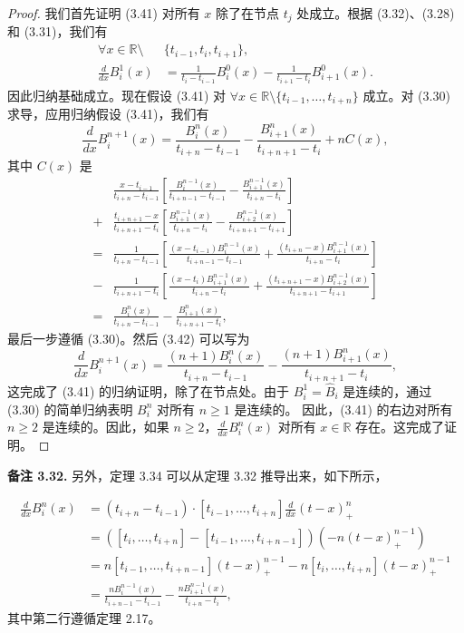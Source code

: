 \documentclass[a4paper]{ctexart}
\begin{document}
{\begin{proof}
我们首先证明 (3.41) 对所有 $x$ 除了在节点 $t_j$ 处成立。根据 (3.32)、(3.28) 和 (3.31)，我们有
  \begin{align*}
  \forall x \in \mathbb{R} \setminus &\{t_{i-1}, t_i, t_{i+1}\}, \\
  \frac{d}{dx} B_i^1(x) &= \frac{1}{t_i - t_{i-1}} B_i^0(x) - \frac{1}{t_{i+1} - t_i} B_{i+1}^0(x).
  \end{align*}
  因此归纳基础成立。现在假设 (3.41) 对 $\forall x \in \mathbb{R} \setminus \{t_{i-1}, \ldots, t_{i+n}\}$ 成立。对 (3.30) 求导，应用归纳假设 (3.41)，我们有
  \[
  \frac{d}{dx} B_i^{n+1}(x) = \frac{B_i^n(x)}{t_{i+n} - t_{i-1}} - \frac{B_{i+1}^n(x)}{t_{i+n+1} - t_i} + n C(x),
  \tag{3.42}
  \]
  其中 $C(x)$ 是
  \begin{align*}
  &\frac{x - t_{i-1}}{t_{i+n} - t_{i-1}} \left[ \frac{B_i^{n-1}(x)}{t_{i+n-1} - t_{i-1}} - \frac{B_{i+1}^{n-1}(x)}{t_{i+n} - t_i} \right] \\
  +& \frac{t_{i+n+1} - x}{t_{i+n+1} - t_i} \left[ \frac{B_{i+1}^{n-1}(x)}{t_{i+n} - t_i} - \frac{B_{i+2}^{n-1}(x)}{t_{i+n+1} - t_{i+1}} \right] \\
  =& \frac{1}{t_{i+n} - t_{i-1}} \left[ \frac{(x - t_{i-1}) B_i^{n-1}(x)}{t_{i+n-1} - t_{i-1}} + \frac{(t_{i+n} - x) B_{i+1}^{n-1}(x)}{t_{i+n} - t_i} \right] \\
  -& \frac{1}{t_{i+n+1} - t_i} \left[ \frac{(x - t_i) B_{i+1}^{n-1}(x)}{t_{i+n} - t_i} + \frac{(t_{i+n+1} - x) B_{i+2}^{n-1}(x)}{t_{i+n+1} - t_{i+1}} \right] \\
  =& \frac{B_i^n(x)}{t_{i+n} - t_{i-1}} - \frac{B_{i+1}^n(x)}{t_{i+n+1} - t_i},
  \end{align*}
  最后一步遵循 (3.30)。然后 (3.42) 可以写为
  \[
  \frac{d}{dx} B_i^{n+1}(x) = \frac{(n+1) B_i^n(x)}{t_{i+n} - t_{i-1}} - \frac{(n+1) B_{i+1}^n(x)}{t_{i+n+1} - t_i},
  \]
  这完成了 (3.41) 的归纳证明，除了在节点处。由于 $B_i^1 = \hat{B}_i$ 是连续的，通过 (3.30) 的简单归纳表明 $B_i^n$ 对所有 $n \geq 1$ 是连续的。
  因此，(3.41) 的右边对所有 $n \geq 2$ 是连续的。因此，如果 $n \geq 2$，$\frac{d}{dx} B_i^n(x)$ 对所有 $x \in \mathbb{R}$ 存在。这完成了证明。
\end{proof}

\noindent \textbf{备注 3.32.} 另外，定理 3.34 可以从定理 3.32 推导出来，如下所示，

\begin{align*}
\frac{d}{dx} B_i^n(x) &= (t_{i+n} - t_{i-1}) \cdot [t_{i-1}, \ldots, t_{i+n}] \frac{d}{dx} (t-x)_+^n \\
&= \left([t_i, \ldots, t_{i+n}] - [t_{i-1}, \ldots, t_{i+n-1}]\right) \left(-n(t-x)_+^{n-1}\right) \\
&= n[t_{i-1}, \ldots, t_{i+n-1}](t-x)_+^{n-1} - n[t_i, \ldots, t_{i+n}](t-x)_+^{n-1} \\
&= \frac{n B_i^{n-1}(x)}{t_{i+n-1} - t_{i-1}} - \frac{n B_{i+1}^{n-1}(x)}{t_{i+n} - t_i},
\end{align*}
其中第二行遵循定理 2.17。

}
\end{document}
